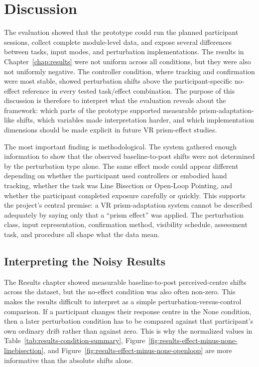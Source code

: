 \chapter{Discussion}
\label{chap:Discussion}

The evaluation showed that the prototype could run the planned participant sessions, collect complete module-level data, and expose several differences between tasks, input modes, and perturbation implementations. The results in Chapter~\ref{chap:results} were not uniform across all conditions, but they were also not uniformly negative. The controller condition, where tracking and confirmation were most stable, showed perturbation shifts above the participant-specific no-effect reference in every tested task/effect combination. The purpose of this discussion is therefore to interpret what the evaluation reveals about the framework: which parts of the prototype supported measurable prism-adaptation-like shifts, which variables made interpretation harder, and which implementation dimensions should be made explicit in future VR prism-effect studies.

The most important finding is methodological. The system gathered enough information to show that the observed baseline-to-post shifts were not determined by the perturbation type alone. The same effect mode could appear different depending on whether the participant used controllers or embodied hand tracking, whether the task was Line Bisection or Open-Loop Pointing, and whether the participant completed exposure carefully or quickly. This supports the project's central premise: a VR prism-adaptation system cannot be described adequately by saying only that a ``prism effect'' was applied. The perturbation class, input representation, confirmation method, visibility schedule, assessment task, and procedure all shape what the data mean.

\section{Interpreting the Noisy Results}
\label{sec:discussion-noisy-results}

The Results chapter showed measurable baseline-to-post perceived-centre shifts across the dataset, but the no-effect condition was also often non-zero. This makes the results difficult to interpret as a simple perturbation-versus-control comparison. If a participant changes their response centre in the None condition, then a later perturbation condition has to be compared against that participant's own ordinary drift rather than against zero. This is why the normalized values in Table~\ref{tab:results-condition-summary}, Figure~\ref{fig:results-effect-minus-none-linebisection}, and Figure~\ref{fig:results-effect-minus-none-openloop} are more informative than the absolute shifts alone.

